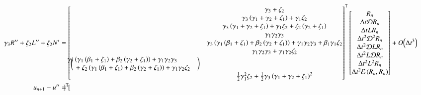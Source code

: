 \documentclass[letterpaper,11pt]{amsart}
\newcommand{\trans}[1]{{#1}^{\ensuremath{\mathsf{T}}}}
\newcommand{\order}[2]{\ensuremath{O\!\left( {#1}^{#2} \right)}}
\begin{document}
\begin{align}
      \gamma_{3} R''
    + \zeta_{2}  L''
    + \zeta_{2}  N'
  &=
\trans{\begin{bmatrix}
  &\gamma_{3} + \zeta_{2} \\
    &\gamma_{3} \left( \gamma_{1} + \gamma_{2} + \zeta_{1} \right)
  + \gamma_{1} \zeta_{2} \\
    &\gamma_{3} \left( \gamma_{1} + \gamma_{2} + \zeta_{1} \right)
  + \gamma_{1} \zeta_{2}
  + \zeta_{2} \left( \gamma_{2} + \zeta_{1} \right) \\
  &\gamma_{1} \gamma_{2} \gamma_{3} \\
    &\gamma_{3} \left(
       \gamma_{1} \left(\beta_{1}+\zeta_{1}\right)
      +\beta_{2} \left(\gamma_{2}+\zeta_{1}\right)
    \right)
  + \gamma_{1} \gamma_{2} \gamma_{3}
  + \beta_{1} \gamma_{1} \zeta_{2} \\
    &\gamma_{1} \gamma_{2} \gamma_{3}
  + \gamma_{1} \gamma_{2} \zeta_{2} \\
%
\bigg(\mspace{-18mu}
\begin{split}
    &\gamma_{3} \left(
       \gamma_{1} \left(\beta_{1}+\zeta_{1}\right)
      +\beta_{2} \left(\gamma_{2}+\zeta_{1}\right)
    \right)
  + \gamma_{1} \gamma_{2} \gamma_{3}
  \\
  &\quad+ \zeta_{2} \left(
       \gamma_{1} \left(\beta_{1}+\zeta_{1}\right)
      +\beta_{2} \left(\gamma_{2}+\zeta_{1}\right)
    \right)
  + \gamma_{1} \gamma_{2} \zeta_{2}
\end{split}
\mspace{18mu}\bigg)
  \\
%
    &\frac{1}{2}\gamma_{1}^{2}\zeta_{2}
  + \frac{1}{2}\gamma_{3}\left( \gamma_{1} + \gamma_{2} + \zeta_{1} \right)^{2}
\end{bmatrix}}
\begin{bmatrix}
  R_{n} \\
  \Delta{}t \mathcal{D} R_{n} \\
  \Delta{}t L R_{n} \\
  \Delta{}t^{2} \mathcal{D}^{2} R_{n} \\
  \Delta{}t^{2} \mathcal{D} L R_{n} \\
  \Delta{}t^{2} L \mathcal{D} R_{n} \\
  \Delta{}t^{2} L^{2} R_{n} \\
  \Delta{}t^{2} \mathcal{E}\left( R_{n}, R_{n} \right)
\end{bmatrix}
  + \order{\Delta{}t}{3}
\\
  u_{n+1}-u''
  &=
\trans{\begin{bmatrix}

\end{bmatrix}}
\end{align}
\end{document}

